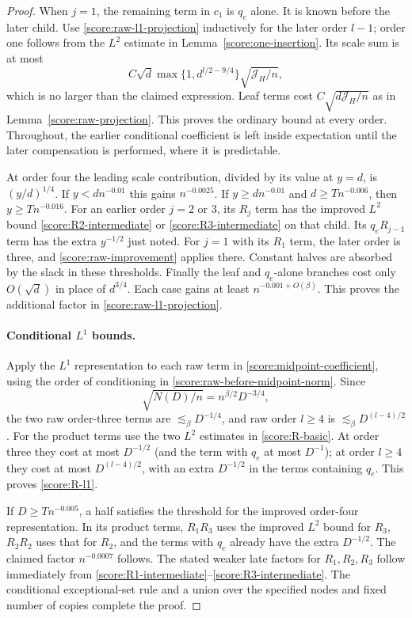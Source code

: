 \begin{proof}
When $j=1$, the remaining term in $c_1$ is $q_e$ alone.  It is known before
the later child.  Use \eqref{score:raw-l1-projection} inductively for the
later order $l-1$; order one follows from the $L^2$ estimate in
Lemma~\ref{score:one-insertion}.  Its scale sum is at most
\[
 C\sqrt d\max\{1,d^{l/2-9/4}\}\sqrt{\mathcal J_H/n},
\]
which is no larger than the claimed expression.  Leaf terms cost
$C\sqrt{d\mathcal J_H/n}$ as in Lemma~\ref{score:raw-projection}.  This proves
the ordinary bound at every order.  Throughout, the earlier conditional
coefficient is left inside expectation until the later compensation is
performed, where it is predictable.

At order four the leading scale contribution, divided by its value at
$y=d$, is $(y/d)^{1/4}$.  If $y<dn^{-0.01}$ this gains $n^{-0.0025}$.
If $y\ge dn^{-0.01}$ and $d\ge Tn^{-0.006}$, then
$y\ge Tn^{-0.016}$.  For an earlier order $j=2$ or $3$, its $R_j$ term has
the improved $L^2$ bound \eqref{score:R2-intermediate} or
\eqref{score:R3-intermediate} on that child.  Its $q_eR_{j-1}$ term has
the extra $y^{-1/2}$ just noted.  For $j=1$ with its $R_1$ term, the later
order is three, and \eqref{score:raw-improvement} applies there.  Constant
halves are absorbed by the slack in these thresholds.  Finally the leaf
and $q_e$-alone branches cost only $O(\sqrt d)$ in place of $d^{3/4}$.
Each case gains at least $n^{-0.001+O(\beta)}$.  This proves the additional
factor in \eqref{score:raw-l1-projection}.

\paragraph{Conditional $L^1$ bounds.}
Apply the $L^1$ representation to each raw term in
\eqref{score:midpoint-coefficient}, using the order of conditioning in
\eqref{score:raw-before-midpoint-norm}.  Since
\begin{equation}\label{score:node-action-scale}
 \sqrt{N(D)/n}=n^{\beta/2}D^{-3/4},
\end{equation}
the two raw order-three terms are $\lesssim_\beta D^{-1/4}$, and raw order
$l\ge4$ is $\lesssim_\beta D^{(l-4)/2}$.  For the product terms use the
two $L^2$ estimates in \eqref{score:R-basic}.  At order three they cost at
most $D^{-1/2}$ (and the term with $q_e$ at most $D^{-1}$); at order
$l\ge4$ they cost at most $D^{(l-4)/2}$, with an extra $D^{-1/2}$ in the
terms containing $q_e$.  This proves \eqref{score:R-l1}.

If $D\ge Tn^{-0.005}$, a half satisfies the threshold for the improved
order-four representation.  In its product terms, $R_1R_3$ uses the
improved $L^2$ bound for $R_3$, $R_2R_2$ uses that for $R_2$, and the terms
with $q_e$ already have the extra $D^{-1/2}$.  The claimed factor
$n^{-0.0007}$ follows.  The stated weaker late factors for $R_1,R_2,R_3$
follow immediately from \eqref{score:R1-intermediate}--\eqref{score:R3-intermediate}.
The conditional exceptional-set rule and a union over the specified nodes
and fixed number of copies complete the proof.
\end{proof}


